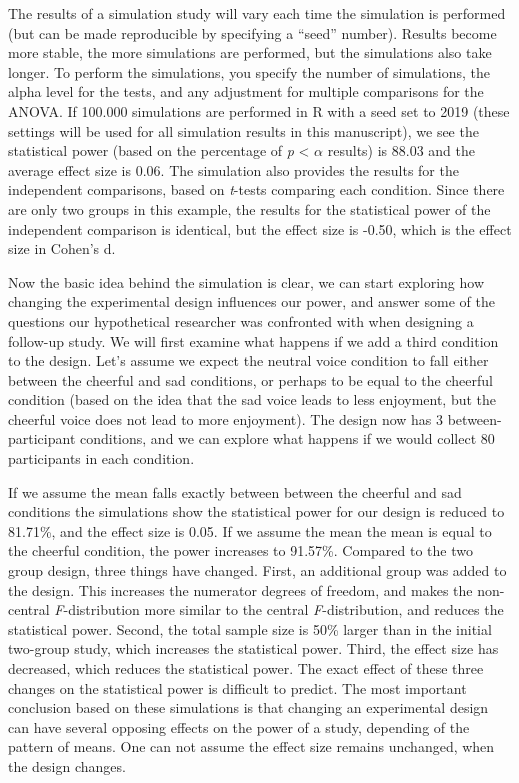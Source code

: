 \documentclass[,jou, draftfirst, a4paper,floatsintext]{apa6}
\begin{document}
The results of a simulation study will vary each time the simulation is performed (but can be made reproducible by specifying a \enquote{seed} number).
Results become more stable, the more simulations are performed, but the simulations also take longer.
To perform the simulations, you specify the number of simulations, the alpha level for the tests, and any adjustment for multiple comparisons for the ANOVA.
If 100.000 simulations are performed in R with a seed set to 2019 (these settings will be used for all simulation results in this manuscript), we see the statistical power (based on the percentage of \emph{p} \textless{} \(\alpha\) results) is 88.03 and the average effect size is 0.06.
The simulation also provides the results for the independent comparisons, based on \emph{t}-tests comparing each condition.
Since there are only two groups in this example, the results for the statistical power of the independent comparison is identical, but the effect size is -0.50, which is the effect size in Cohen's d.~

Now the basic idea behind the simulation is clear, we can start exploring how changing the experimental design influences our power, and answer some of the questions our hypothetical researcher was confronted with when designing a follow-up study.
We will first examine what happens if we add a third condition to the design.
Let's assume we expect the neutral voice condition to fall either between the cheerful and sad conditions, or perhaps to be equal to the cheerful condition (based on the idea that the sad voice leads to less enjoyment, but the cheerful voice does not lead to more enjoyment).
The design now has 3 between-participant conditions, and we can explore what happens if we would collect 80 participants in each condition.

If we assume the mean falls exactly between between the cheerful and sad conditions the simulations show the statistical power for our design is reduced to 81.71\%, and the effect size is 0.05.
If we assume the mean the mean is equal to the cheerful condition, the power increases to 91.57\%.
Compared to the two group design, three things have changed.
First, an additional group was added to the design.
This increases the numerator degrees of freedom, and makes the non-central \emph{F}-distribution more similar to the central \emph{F}-distribution, and reduces the statistical power.
Second, the total sample size is 50\% larger than in the initial two-group study, which increases the statistical power.
Third, the effect size has decreased, which reduces the statistical power.
The exact effect of these three changes on the statistical power is difficult to predict.
The most important conclusion based on these simulations is that changing an experimental design can have several opposing effects on the power of a study, depending of the pattern of means.
One can not assume the effect size remains unchanged, when the design changes.
\end{document}
